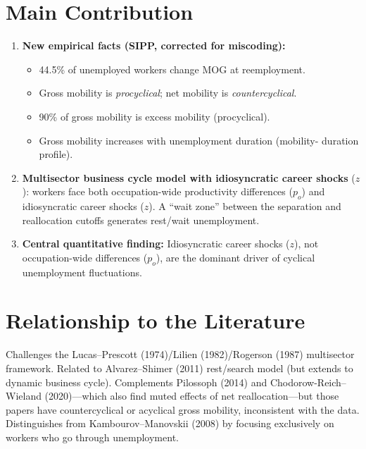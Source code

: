 \section{Main Contribution}

\begin{enumerate}
  \item \textbf{New empirical facts (SIPP, corrected for miscoding):}
    \begin{itemize}
      \item 44.5\% of unemployed workers change MOG at reemployment.
      \item Gross mobility is \emph{procyclical}; net mobility is
        \emph{countercyclical}.
      \item 90\% of gross mobility is excess mobility (procyclical).
      \item Gross mobility increases with unemployment duration (mobility-
        duration profile).
    \end{itemize}
  \item \textbf{Multisector business cycle model with idiosyncratic career
    shocks} ($z$): workers face both occupation-wide productivity differences
    ($p_o$) and idiosyncratic career shocks ($z$). A ``wait zone'' between the
    separation and reallocation cutoffs generates rest/wait unemployment.
  \item \textbf{Central quantitative finding:} Idiosyncratic career shocks
    ($z$), not occupation-wide differences ($p_o$), are the dominant driver
    of cyclical unemployment fluctuations.
\end{enumerate}

\section{Relationship to the Literature}

Challenges the Lucas--Prescott (1974)/Lilien (1982)/Rogerson (1987)
multisector framework. Related to Alvarez--Shimer (2011) rest/search model
(but extends to dynamic business cycle). Complements Pilossoph (2014) and
Chodorow-Reich--Wieland (2020)---which also find muted effects of net
reallocation---but those papers have countercyclical or acyclical gross
mobility, inconsistent with the data. Distinguishes from Kambourov--Manovskii
(2008) by focusing exclusively on workers who go through unemployment.

